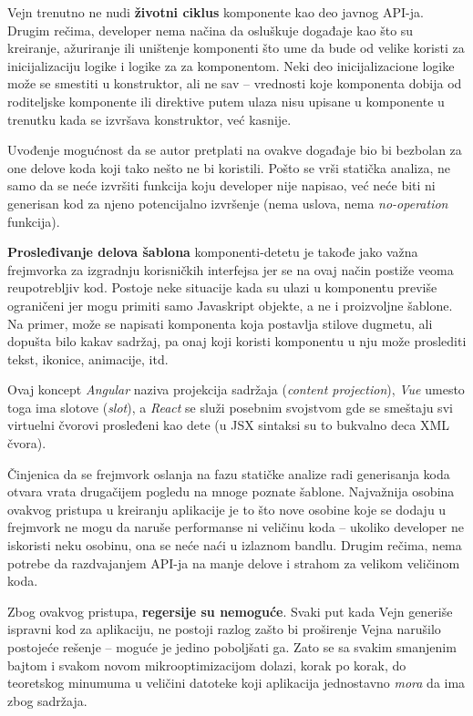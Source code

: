 Vejn trenutno ne nudi \textbf{životni ciklus} komponente kao deo javnog API-ja.
Drugim rečima, developer nema načina da osluškuje događaje kao što su kreiranje, ažuriranje ili uništenje komponenti što ume da bude od velike koristi za inicijalizaciju logike i logike za  za komponentom.
Neki deo inicijalizacione logike može se smestiti u konstruktor, ali ne sav -- vrednosti koje komponenta dobija od roditeljske komponente ili direktive putem ulaza nisu upisane u komponente u trenutku kada se izvršava konstruktor, već kasnije.

Uvođenje mogućnost da se autor pretplati na ovakve događaje bio bi bezbolan za one delove koda koji tako nešto ne bi koristili.
Pošto se vrši statička analiza, ne samo da se neće izvršiti funkcija koju developer nije napisao, već neće biti ni generisan kod za njeno potencijalno izvršenje (nema uslova, nema \textsl{no-operation} funkcija).

\textbf{Prosleđivanje delova šablona} komponenti-detetu je takođe jako važna frejmvorka za izgradnju korisničkih interfejsa jer se na ovaj način postiže veoma reupotrebljiv kod.
Postoje neke situacije kada su ulazi u komponentu previše ograničeni jer mogu primiti samo Javaskript objekte, a ne i proizvoljne šablone.
Na primer, može se napisati komponenta koja postavlja stilove dugmetu, ali dopušta bilo kakav sadržaj, pa onaj koji koristi komponentu u nju može proslediti tekst, ikonice, animacije, itd.

Ovaj koncept \textsl{Angular} naziva projekcija sadržaja (\textsl{content projection}), \textsl{Vue} umesto toga ima slotove (\textsl{slot}), a \textsl{React} se služi posebnim svojstvom  gde se smeštaju svi virtuelni čvorovi prosleđeni kao dete (u JSX sintaksi su to bukvalno deca XML čvora).

Činjenica da se frejmvork oslanja na fazu statičke analize radi generisanja koda otvara vrata drugačijem pogledu na mnoge poznate šablone.
Najvažnija osobina ovakvog pristupa u kreiranju aplikacije je to što nove osobine koje se dodaju u frejmvork ne mogu da naruše performanse ni veličinu koda -- ukoliko developer ne iskoristi neku osobinu, ona se neće naći u izlaznom bandlu.
Drugim rečima, nema potrebe da razdvajanjem API-ja na manje delove i strahom za velikom veličinom koda.

Zbog ovakvog pristupa, \textbf{regersije su nemoguće}.
Svaki put kada Vejn generiše ispravni kod za aplikaciju, ne postoji razlog zašto bi proširenje Vejna narušilo postojeće rešenje -- moguće je jedino poboljšati ga.
Zato se sa svakim smanjenim bajtom i svakom novom mikrooptimizacijom dolazi, korak po korak, do teoretskog minumuma u veličini datoteke koji aplikacija jednostavno \emph{mora} da ima zbog sadržaja.

